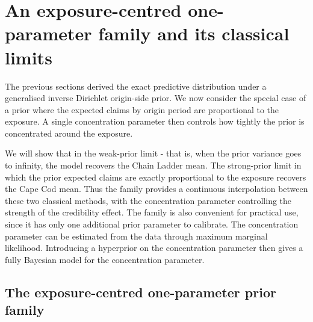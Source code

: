 \documentclass[11pt]{article}
\newcommand{\1}{\mathbf{1}}
\begin{document}
\section{An exposure-centred one-parameter family and its classical limits}\label{sec:hierarchical}

The previous sections derived the exact predictive distribution under a generalised inverse Dirichlet origin-side prior. 
We now consider the special case of a prior where the expected claims by origin period 
are proportional to the exposure. A single concentration parameter then controls how tightly the prior is concentrated 
around the exposure.

We will show that in the weak-prior limit - that is, when the prior variance goes to infinity, the model recovers 
the Chain Ladder mean. The strong-prior limit in which the prior expected claims are exactly proportional to the 
exposure recovers the Cape Cod mean. Thus the family provides a continuous interpolation between these two classical methods, with the concentration parameter controlling the strength of the credibility effect. 
The family is also convenient for practical use, since it has only one additional prior parameter to calibrate. The concentration parameter can be estimated from the data through maximum marginal likelihood. 
Introducing a hyperprior on the concentration parameter then gives a fully Bayesian model for the concentration parameter.

\subsection{The exposure-centred one-parameter prior family}\label{subsec:hier_prior}
\end{document}
